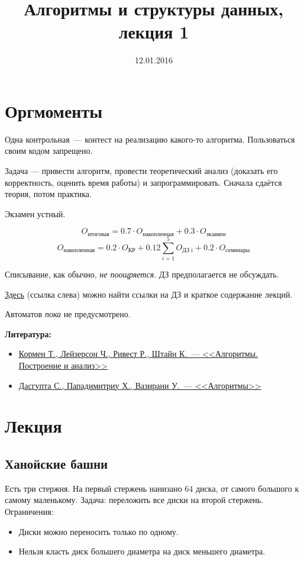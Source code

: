\documentclass[12pt,a4paper]{article}
\title{Алгоритмы и структуры данных, лекция 1}
\date{12.01.2016}
\author{}
\begin{document}
\maketitle

\section*{Оргмоменты}
Одна контрольная~--- контест на реализацию какого-то алгоритма. Пользоваться своим кодом запрещено.

Задача --- привести алгоритм, провести теоретический анализ (доказать его корректность, оценить время работы) и запрограммировать. Сначала сдаётся теория, потом практика.

Экзамен устный.

\[O_{\text{итоговая}} = 0.7 \cdot O_{\text{накопленная}}+0.3 \cdot O_{\text{экзамен}}\]
\[O_{\text{накопленная}} = 0.2 \cdot O_{\text{КР}} + 0.12 \sum\limits_{i = 1}^{5} O_{\text{ДЗ i}} + 0.2 \cdot O_{\text{семинары}}\]

Списывание, как обычно, \emph{не поощряется}. ДЗ предполагается не обсуждать.

\href{http://wiki.cs.hse.ru/}{Здесь} (ссылка слева) можно найти ссылки на ДЗ и краткое содержание лекций.

Автоматов \emph{пока} не предусмотрено.

\textbf{Литература:}
\begin{itemize}
    \item \href{https://yadi.sk/i/1enAa7YHmruFw}{Кормен Т., Лейзерсон Ч., Ривест Р., Штайн К.~--- <<Алгоритмы. Построение и анализ>>}
    \item \href{https://yadi.sk/i/E_0-SVipmrvPz}{Дасгупта С., Пападимитриу Х., Вазирани У.~--- <<Алгоритмы>>}
\end{itemize}

\section*{Лекция}

\subsection*{Ханойские башни}
Есть три стержня. На первый стержень нанизано 64 диска, от самого большого к самому маленькому. Задача: переложить все диски на второй стержень. Ограничения:
\begin{itemize}
    \item Диски можно переносить только по одному.
    \item Нельзя класть диск большего диаметра на диск меньшего диаметра.
\end{itemize}
\end{document}
